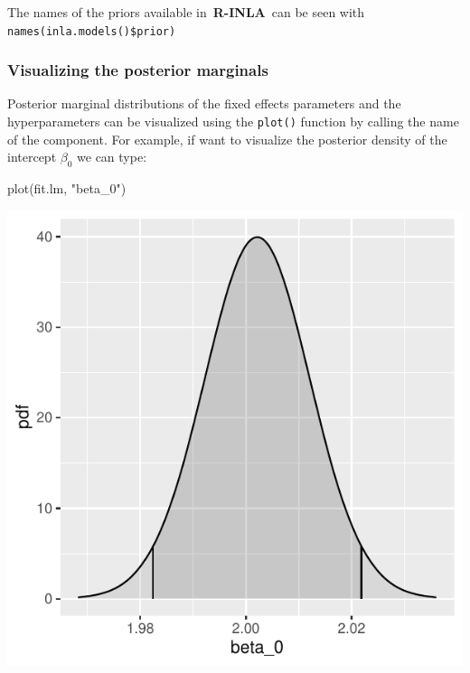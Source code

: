 \documentclass[
  letterpaper,
  DIV=11,
  numbers=noendperiod]{scrartcl}
\newenvironment{Shaded}{\begin{snugshade}}{\end{snugshade}}
\newcommand{\FunctionTok}[1]{\textcolor[rgb]{0.28,0.35,0.67}{#1}}
\newcommand{\NormalTok}[1]{\textcolor[rgb]{0.00,0.23,0.31}{#1}}
\newcommand{\StringTok}[1]{\textcolor[rgb]{0.13,0.47,0.30}{#1}}
\begin{document}
The names of the priors available in~\textbf{R-INLA}~can be seen with
\texttt{names(inla.models()\$prior)}

\subsubsection{Visualizing the posterior
marginals}\label{visualizing-the-posterior-marginals}

Posterior marginal distributions of the ﬁxed effects parameters and the
hyperparameters can be visualized using the \texttt{plot()} function by
calling the name of the component. For example, if want to visualize the
posterior density of the intercept \(\beta_0\) we can type:

\begin{Shaded}
\begin{Highlighting}[]
\FunctionTok{plot}\NormalTok{(fit.lm, }\StringTok{"beta\_0"}\NormalTok{)}
\end{Highlighting}
\end{Shaded}

\begin{center}
\includegraphics{day1_practical_2_files/figure-pdf/unnamed-chunk-10-1.pdf}
\end{center}
\end{document}
